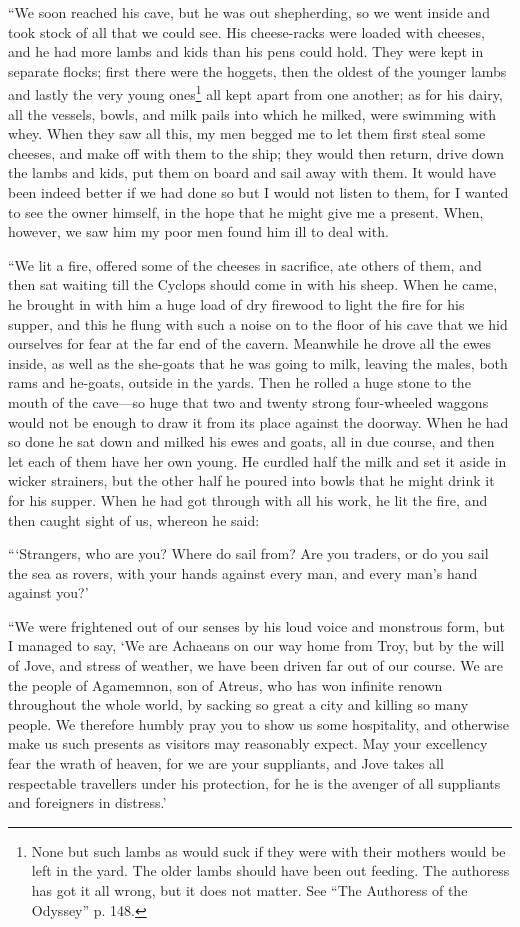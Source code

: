 “We soon reached his cave, but he was out shepherding, so we went inside and
took stock of all that we could see. His cheese-racks were loaded with cheeses,
and he had more lambs and kids than his pens could hold. They were kept in
separate flocks; first there were the hoggets, then the oldest of the younger
lambs and lastly the very young ones\footnote{None but such lambs as would suck if they were with their mothers would be
left in the yard. The older lambs should have been out feeding. The authoress
has got it all wrong, but it does not matter. See “The Authoress of the
Odyssey” p. 148.} all kept apart from one another; as
for his dairy, all the vessels, bowls, and milk pails into which he milked,
were swimming with whey. When they saw all this, my men begged me to let them
first steal some cheeses, and make off with them to the ship; they would then
return, drive down the lambs and kids, put them on board and sail away with
them. It would have been indeed better if we had done so but I would not listen
to them, for I wanted to see the owner himself, in the hope that he might give
me a present. When, however, we saw him my poor men found him ill to deal with.

“We lit a fire, offered some of the cheeses in sacrifice, ate others of them,
and then sat waiting till the Cyclops should come in with his sheep. When he
came, he brought in with him a huge load of dry firewood to light the fire for
his supper, and this he flung with such a noise on to the floor of his cave
that we hid ourselves for fear at the far end of the cavern. Meanwhile he drove
all the ewes inside, as well as the she-goats that he was going to milk,
leaving the males, both rams and he-goats, outside in the yards. Then he rolled
a huge stone to the mouth of the cave—so huge that two and twenty strong
four-wheeled waggons would not be enough to draw it from its place against the
doorway. When he had so done he sat down and milked his ewes and goats, all in
due course, and then let each of them have her own young. He curdled half the
milk and set it aside in wicker strainers, but the other half he poured into
bowls that he might drink it for his supper. When he had got through with all
his work, he lit the fire, and then caught sight of us, whereon he said:

“‘Strangers, who are you? Where do sail from? Are you traders, or do you sail
the sea as rovers, with your hands against every man, and every man’s hand
against you?’

“We were frightened out of our senses by his loud voice and monstrous form, but
I managed to say, ‘We are Achaeans on our way home from Troy, but by the will
of Jove, and stress of weather, we have been driven far out of our course. We
are the people of Agamemnon, son of Atreus, who has won infinite renown
throughout the whole world, by sacking so great a city and killing so many
people. We therefore humbly pray you to show us some hospitality, and otherwise
make us such presents as visitors may reasonably expect. May your excellency
fear the wrath of heaven, for we are your suppliants, and Jove takes all
respectable travellers under his protection, for he is the avenger of all
suppliants and foreigners in distress.’

